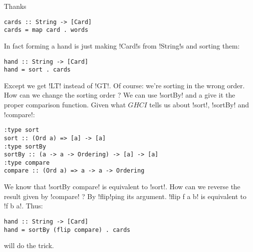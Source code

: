 \hspace*{\fill}
\lhA \error Thanks
\begin{lstlisting}[frame=single]
cards :: String -> [Card]
cards = map card . words 
\end{lstlisting}
In fact forming a hand is just making \il!Card!s from \il!String!s and sorting them:
\begin{lstlisting}[frame=single]
hand :: String -> [Card]
hand = sort . cards
\end{lstlisting}
\failure Except we get \il!LT! instead of \il!GT!.
\lhN Of course: we're sorting in the wrong order. How can we change the sorting order ?
\lhA We can use \il!sortBy! and a give it the proper comparison function. 
\lhN Given what $GHCI$ tells us about \il!sort!, \il!sortBy! and \il!compare!:
\begin{small}
\begin{verbatim}
:type sort
sort :: (Ord a) => [a] -> [a]
:type sortBy
sortBy :: (a -> a -> Ordering) -> [a] -> [a]
:type compare
compare :: (Ord a) => a -> a -> Ordering
\end{verbatim}
\end{small}
We know that \il!sortBy compare! is equivalent to \il!sort!. 
How can we reverse the result given by \il!compare! ?
\lhA By \il!flip!ping its argument. \il!flip f a b! is equivalent to \il!f b a!. Thus:
\begin{lstlisting}[frame=single]
hand :: String -> [Card]
hand = sortBy (flip compare) . cards
\end{lstlisting}
\success will do the trick.
\lhend


